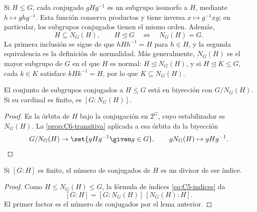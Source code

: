 Si $H\le G$, cada conjugado $gHg^{-1}$ es un subgrupo isomorfo a $H$, mediante $h\mapsto ghg^{-1}$. Esta función conserva productos y tiene inversa $x\mapsto g^{-1}xg$; en particular, los subgrupos conjugados tienen el mismo orden. Además,
\[
H\subseteq N_G(H),\qquad
H\trianglelefteq G\quad\Longleftrightarrow\quad N_G(H)=G.
\]
La primera inclusión se sigue de que $hHh^{-1}=H$ para $h\in H$, y la segunda equivalencia es la definición de normalidad. Más generalmente, $N_G(H)$ es el mayor subgrupo de $G$ en el que $H$ es normal: $H\trianglelefteq N_G(H)$, y si $H\trianglelefteq K\le G$, cada $k\in K$ satisface $kHk^{-1}=H$, por lo que $K\subseteq N_G(H)$.

\begin{lema}\label{lema:C6-conjugados}
El conjunto de subgrupos conjugados a $H\le G$ está en biyección con $G/N_G(H)$. Si su cardinal es finito, es $[G:N_G(H)]$.
\end{lema}
\begin{proof}
Es la órbita de $H$ bajo la conjugación en $2^G$, cuyo estabilizador es $N_G(H)$. La \cref{prop:C6-transitiva} aplicada a esa órbita da la biyección
\[
G/N_G(H)\to\set{gHg^{-1}\given g\in G},\qquad
gN_G(H)\mapsto gHg^{-1}.\qedhere
\]
\end{proof}
\begin{coro}
Si $[G:H]$ es finito, el número de conjugados de $H$ es un divisor de ese índice.
\end{coro}
\begin{proof}
Como $H\le N_G(H)\le G$, la fórmula de índices \eqref{eq:C5-indices} da
\[
[G:H]=[G:N_G(H)]\,[N_G(H):H].
\]
El primer factor es el número de conjugados por el lema anterior.
\end{proof}

